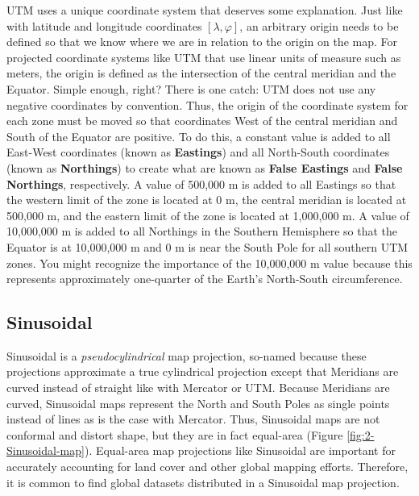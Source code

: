 \documentclass[
]{book}
\begin{document}
UTM uses a unique coordinate system that deserves some explanation. Just like with latitude and longitude coordinates \([λ,φ]\), an arbitrary origin needs to be defined so that we know where we are in relation to the origin on the map. For projected coordinate systems like UTM that use linear units of measure such as meters, the origin is defined as the intersection of the central meridian and the Equator. Simple enough, right? There is one catch: UTM does not use any negative coordinates by convention. Thus, the origin of the coordinate system for each zone must be moved so that coordinates West of the central meridian and South of the Equator are positive. To do this, a constant value is added to all East-West coordinates (known as \textbf{Eastings}) and all North-South coordinates (known as \textbf{Northings}) to create what are known as \textbf{False Eastings} and \textbf{False Northings}, respectively. A value of 500,000 m is added to all Eastings so that the western limit of the zone is located at 0 m, the central meridian is located at 500,000 m, and the eastern limit of the zone is located at 1,000,000 m. A value of 10,000,000 m is added to all Northings in the Southern Hemisphere so that the Equator is at 10,000,000 m and 0 m is near the South Pole for all southern UTM zones. You might recognize the importance of the 10,000,000 m value because this represents approximately one-quarter of the Earth's North-South circumference.

\subsection{Sinusoidal}\label{sinusoidal}

Sinusoidal is a \emph{pseudocylindrical} map projection, so-named because these projections approximate a true cylindrical projection except that Meridians are curved instead of straight like with Mercator or UTM. Because Meridians are curved, Sinusoidal maps represent the North and South Poles as single points instead of lines as is the case with Mercator. Thus, Sinusoidal maps are not conformal and distort shape, but they are in fact equal-area (Figure \ref{fig:2-Sinusoidal-map}). Equal-area map projections like Sinusoidal are important for accurately accounting for land cover and other global mapping efforts. Therefore, it is common to find global datasets distributed in a Sinusoidal map projection.
\end{document}
